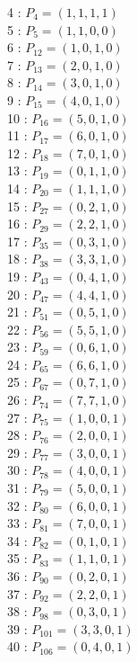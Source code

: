 \documentclass{article}
\begin{document}
{\begin{multicols}{3}
4 : $P_{4}=( 1, 1, 1, 1 )$\\
5 : $P_{5}=( 1, 1, 0, 0 )$\\
6 : $P_{12}=( 1, 0, 1, 0 )$\\
7 : $P_{13}=( 2, 0, 1, 0 )$\\
8 : $P_{14}=( 3, 0, 1, 0 )$\\
9 : $P_{15}=( 4, 0, 1, 0 )$\\
10 : $P_{16}=( 5, 0, 1, 0 )$\\
11 : $P_{17}=( 6, 0, 1, 0 )$\\
12 : $P_{18}=( 7, 0, 1, 0 )$\\
13 : $P_{19}=( 0, 1, 1, 0 )$\\
14 : $P_{20}=( 1, 1, 1, 0 )$\\
15 : $P_{27}=( 0, 2, 1, 0 )$\\
16 : $P_{29}=( 2, 2, 1, 0 )$\\
17 : $P_{35}=( 0, 3, 1, 0 )$\\
18 : $P_{38}=( 3, 3, 1, 0 )$\\
19 : $P_{43}=( 0, 4, 1, 0 )$\\
20 : $P_{47}=( 4, 4, 1, 0 )$\\
21 : $P_{51}=( 0, 5, 1, 0 )$\\
22 : $P_{56}=( 5, 5, 1, 0 )$\\
23 : $P_{59}=( 0, 6, 1, 0 )$\\
24 : $P_{65}=( 6, 6, 1, 0 )$\\
25 : $P_{67}=( 0, 7, 1, 0 )$\\
26 : $P_{74}=( 7, 7, 1, 0 )$\\
27 : $P_{75}=( 1, 0, 0, 1 )$\\
28 : $P_{76}=( 2, 0, 0, 1 )$\\
29 : $P_{77}=( 3, 0, 0, 1 )$\\
30 : $P_{78}=( 4, 0, 0, 1 )$\\
31 : $P_{79}=( 5, 0, 0, 1 )$\\
32 : $P_{80}=( 6, 0, 0, 1 )$\\
33 : $P_{81}=( 7, 0, 0, 1 )$\\
34 : $P_{82}=( 0, 1, 0, 1 )$\\
35 : $P_{83}=( 1, 1, 0, 1 )$\\
36 : $P_{90}=( 0, 2, 0, 1 )$\\
37 : $P_{92}=( 2, 2, 0, 1 )$\\
38 : $P_{98}=( 0, 3, 0, 1 )$\\
39 : $P_{101}=( 3, 3, 0, 1 )$\\
40 : $P_{106}=( 0, 4, 0, 1 )$\\

\end{multicols}}
\end{document}
